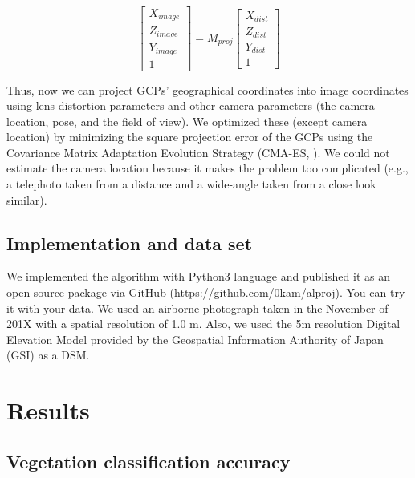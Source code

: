 \documentclass{article}
\begin{document}
\label{proj_tf}
\begin{equation}
  \begin{bmatrix} 
    X_{image} \\ Z_{image} \\ Y_{image} \\ 1 
  \end{bmatrix}
  =
  M_{proj}
  \begin{bmatrix} 
    X_{dist} \\ Z_{dist} \\ Y_{dist} \\ 1 
  \end{bmatrix}
\end{equation}

Thus, now we can project GCPs' geographical coordinates into image coordinates using lens distortion parameters and other camera parameters (the camera location, pose, and the field of view). We optimized these (except camera location) by minimizing the square projection error of the GCPs using the Covariance Matrix Adaptation Evolution Strategy (CMA-ES, \cite{Hansen2003CMAES}). We could not estimate the camera location because it makes the problem too complicated (e.g., a telephoto taken from a distance and a wide-angle taken from a close look similar).

\hypertarget{implementation-and-data-set}{%
\subsection{Implementation and data set}\label{implementation-and-data-set}}

We implemented the algorithm with Python3 language and published it as an open-source package via GitHub (\url{https://github.com/0kam/alproj}). You can try it with your data. We used an airborne photograph taken in the November of 201X with a spatial resolution of 1.0 m. Also, we used the 5m resolution Digital Elevation Model provided by the Geospatial Information Authority of Japan (GSI) as a DSM.

\hypertarget{results}{%
\section{Results}\label{results}}

\hypertarget{vegetation-classification-accuracy}{%
\subsection{Vegetation classification accuracy}\label{vegetation-classification-accuracy}}
\end{document}
